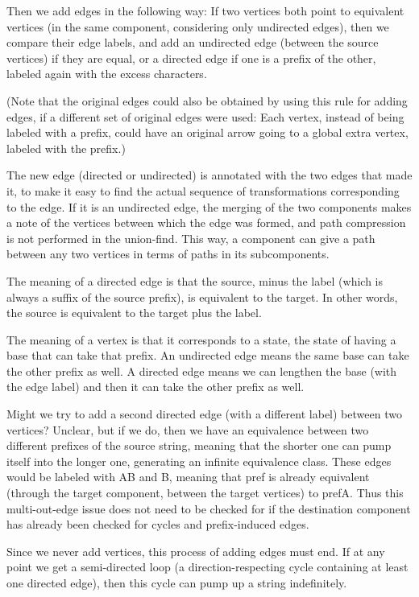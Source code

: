 \documentclass{book}
\begin{document}
Then we add edges in the following way:  If two vertices both point to equivalent vertices (in the same component, considering only undirected edges), then we compare their edge labels, and add an undirected edge (between the source vertices) if they are equal, or a directed edge if one is a prefix of the other, labeled again with the excess characters.

(Note that the original edges could also be obtained by using this rule for adding edges, if a different set of original edges were used: Each vertex, instead of being labeled with a prefix, could have an original arrow going to a global extra vertex, labeled with the prefix.)

The new edge (directed or undirected) is annotated with the two edges that made it, to make it easy to find the actual sequence of transformations corresponding to the edge.  If it is an undirected edge, the merging of the two components makes a note of the vertices between which the edge was formed, and path compression is not performed in the union-find.  This way, a component can give a path between any two vertices in terms of paths in its subcomponents.

The meaning of a directed edge is that the source, minus the label (which is always a suffix of the source prefix), is equivalent to the target.  In other words, the source is equivalent to the target plus the label.

The meaning of a vertex is that it corresponds to a state, the state of having a base that can take that prefix.  An undirected edge means the same base can take the other prefix as well.  A directed edge means we can lengthen the base (with the edge label) and then it can take the other prefix as well.

Might we try to add a second directed edge (with a different label) between two vertices?  Unclear, but if we do, then we have an equivalence between two different prefixes of the source string, meaning that the shorter one can pump itself into the longer one, generating an infinite equivalence class.  These edges would be labeled with AB and B, meaning that pref is already equivalent (through the target component, between the target vertices) to prefA.  Thus this multi-out-edge issue does not need to be checked for if the destination component has already been checked for cycles and prefix-induced edges.

Since we never add vertices, this process of adding edges must end.  If at any point we get a semi-directed loop (a direction-respecting cycle containing at least one directed edge), then this cycle can pump up a string indefinitely.
\end{document}
